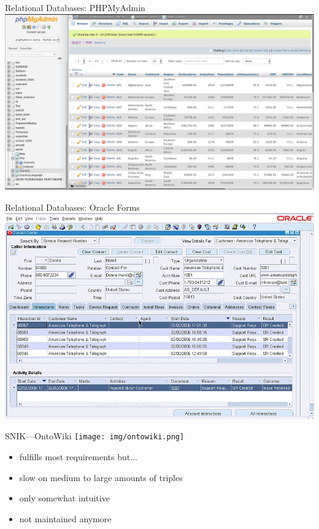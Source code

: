 \documentclass[aspectratio=1610]{beamer}
\begin{document}
\begin{frame}{Relational Databases: PHPMyAdmin}
\centering
\includegraphics[width=0.9\paperwidth]{img/phpmyadmin.png}
\end{frame}

\begin{frame}{Relational Databases: Oracle Forms}
\centering
\includegraphics[width=0.9\paperwidth]{img/oracleforms.png}
\end{frame}

\begin{frame}{SNIK---OntoWiki}
\centering
\texttt{[image: img/ontowiki.png]}
\begin{itemize}
\item fulfills most requirements but...
\item slow on medium to large amounts of triples
\item only somewhat intuitive
\item not maintained anymore
\end{itemize}
\end{frame}
\end{document}

